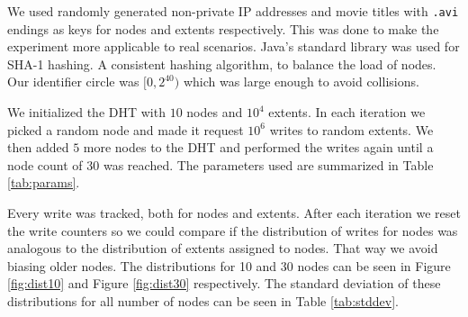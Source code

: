 We used randomly generated non-private IP addresses and movie titles with \texttt{.avi} endings as keys for nodes and extents respectively. This was done to make the experiment more applicable to real scenarios. Java's standard library was used for SHA-1 hashing. A consistent hashing algorithm, to balance the load of nodes. Our identifier circle was $[0,2^{40})$ which was large enough to avoid collisions.

We initialized the DHT with $10$ nodes and $10^4$ extents. In each iteration we picked a random node and made it request $10^6$ writes to random extents. We then added $5$ more nodes to the DHT and performed the writes again until a node count of $30$ was reached. The parameters used are summarized in Table \ref{tab:params}.
\begin{table}[ht!]
    \centering
    \caption{The parameters used for our experiment.}
    \label{tab:params}
\end{table}
Every write was tracked, both for nodes and extents. After each iteration we reset the write counters so we could compare if the distribution of writes for nodes was analogous to the distribution of extents assigned to nodes. That way we avoid biasing older nodes. The distributions for 10 and 30 nodes can be seen in Figure \ref{fig:dist10} and Figure \ref{fig:dist30} respectively. The standard deviation of these distributions for all number of nodes can be seen in Table \ref{tab:stddev}.

